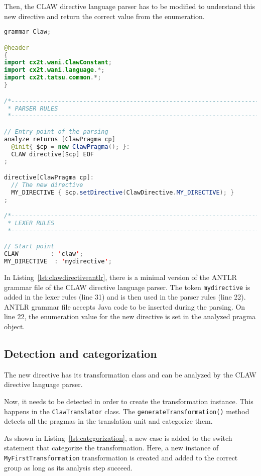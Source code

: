 Then, the CLAW directive language parser has to be modified to understand
this new directive and return the correct value from the enumeration.

\begin{lstlisting}[label=lst:clawdirectiveantlr, caption=Claw.g4,
  language=java]
grammar Claw;

@header
{
import cx2t.wani.ClawConstant;
import cx2t.wani.language.*;
import cx2t.tatsu.common.*;
}

/*----------------------------------------------------------------------------
 * PARSER RULES
 *----------------------------------------------------------------------------*/

// Entry point of the parsing
analyze returns [ClawPragma cp]
  @init{ $cp = new ClawPragma(); }:
  CLAW directive[$cp] EOF
;

directive[ClawPragma cp]:
  // The new directive
  MY_DIRECTIVE { $cp.setDirective(ClawDirective.MY_DIRECTIVE); }
;

/*----------------------------------------------------------------------------
 * LEXER RULES
 *----------------------------------------------------------------------------*/

// Start point
CLAW         : 'claw';
MY_DIRECTIVE  : 'mydirective';
\end{lstlisting}

In Listing~\ref{lst:clawdirectiveantlr}, there is a minimal version of the
ANTLR grammar file of the CLAW directive language parser. The token
\lstinline|mydirective| is added in the lexer rules (line 31) and is then
used in the parser rules (line 22). ANTLR grammar file accepts Java code
to be inserted during the parsing. On line 22, the enumeration value for
the new directive is set in the analyzed pragma object.

\subsection{Detection and categorization}
The new directive has its transformation class and can be analyzed by the
CLAW directive language parser.

Now, it needs to be detected in order to create the transformation instance.
This happens in the \lstinline|ClawTranslator| class. The
\lstinline|generateTransformation()| method detects all the pragmas in the
translation unit and categorize them.

As shown in Listing~\ref{lst:categorization}, a new case is added to the switch
statement that categorize the transformation. Here, a new instance of
\lstinline|MyFirstTransformation| transformation is created and added to the
correct group as long as its analysis step succeed.

